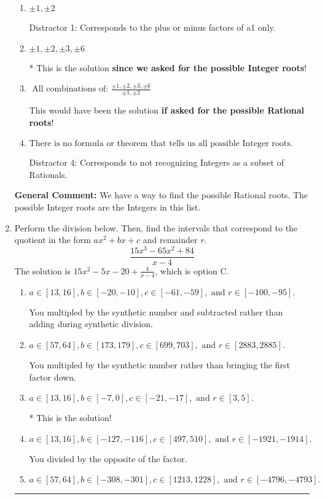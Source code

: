 \documentclass{extbook}[14pt]
\newcommand{\litem}[1]{\item #1

\rule{\textwidth}{0.4pt}}
\begin{document}
\begin{enumerate}
{\begin{enumerate}[label=\Alph*.]
 Distractor 3: Corresponds to the plus or minus of the inverse quotient (an/a0) of the factors. 
\item \( \pm 1,\pm 2 \)

 Distractor 1: Corresponds to the plus or minus factors of a1 only.
\item \( \pm 1,\pm 2,\pm 3,\pm 6 \)

* This is the solution \textbf{since we asked for the possible Integer roots}!
\item \( \text{ All combinations of: }\frac{\pm 1,\pm 2,\pm 3,\pm 6}{\pm 1,\pm 2} \)

This would have been the solution \textbf{if asked for the possible Rational roots}!
\item \( \text{There is no formula or theorem that tells us all possible Integer roots.} \)

 Distractor 4: Corresponds to not recognizing Integers as a subset of Rationals.
\end{enumerate}

\textbf{General Comment:} We have a way to find the possible Rational roots. The possible Integer roots are the Integers in this list.
}
\litem{
Perform the division below. Then, find the intervals that correspond to the quotient in the form $ax^2+bx+c$ and remainder $r$.
\[ \frac{15x^{3} -65 x^{2} + 84}{x -4} \]The solution is \( 15x^{2} -5 x -20 + \frac{4}{x -4} \), which is option C.\begin{enumerate}[label=\Alph*.]
\item \( a \in [13, 16], b \in [-20, -10], c \in [-61, -59], \text{ and } r \in [-100, -95]. \)

 You multipled by the synthetic number and subtracted rather than adding during synthetic division.
\item \( a \in [57, 64], b \in [173, 179], c \in [699, 703], \text{ and } r \in [2883, 2885]. \)

 You multipled by the synthetic number rather than bringing the first factor down.
\item \( a \in [13, 16], b \in [-7, 0], c \in [-21, -17], \text{ and } r \in [3, 5]. \)

* This is the solution!
\item \( a \in [13, 16], b \in [-127, -116], c \in [497, 510], \text{ and } r \in [-1921, -1914]. \)

 You divided by the opposite of the factor.
\item \( a \in [57, 64], b \in [-308, -301], c \in [1213, 1228], \text{ and } r \in [-4796, -4793]. \)


\end{enumerate}}
\end{enumerate}
\end{document}
